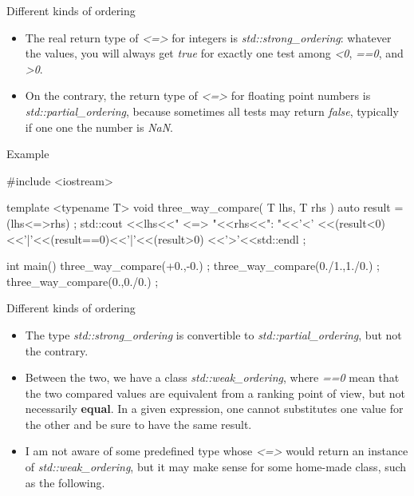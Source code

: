 \begin{frame}[fragile]
  \begin{block}{Different kinds of ordering}
    \begin{itemize}
    \item The real return type of {\it <=>} for integers is {\it std::strong_ordering}: whatever the values, you will always get {\it true} for exactly one test among {\it <0}, {\it ==0}, and {\it >0}.
    \item On the contrary, the return type of {\it <=>} for floating point numbers is {\it std::partial_ordering}, because sometimes all tests may return {\it false}, typically if one one the number is {\it NaN}.
    \end{itemize}
  \end{block}
  \begin{exampleblock}{Example}
    \begin{cppcode*}{}
#include <iostream>

template <typename T>
void three_way_compare( T lhs, T rhs )
 {
  auto result = (lhs<=>rhs) ;
  std::cout
    <<lhs<<" <=> "<<rhs<<": "<<'<'
    <<(result<0)<<'|'<<(result==0)<<'|'<<(result>0)
    <<'>'<<std::endl ;
 }

int main()
 {
  three_way_compare(+0.,-0.) ;
  three_way_compare(0./1.,1./0.) ;
  three_way_compare(0.,0./0.) ;
 }
    \end{cppcode*}
  \end{exampleblock}
\end{frame}

\begin{frame}[fragile]
  \begin{block}{Different kinds of ordering}
    \begin{itemize}
      \item The type {\it std::strong_ordering} is convertible to {\it std::partial_ordering}, but not the contrary.
      \item Between the two, we have a class {\it std::weak_ordering}, where {\it ==0} mean that the two compared values are equivalent from a ranking point of view, but not necessarily \textbf{equal}. In a given expression, one cannot substitutes one value for the other and be sure to have the same result.
      \item I am not aware of some predefined type whose {\it <=>} would return an instance of {\it std::weak_ordering}, but it may make sense for some home-made class, such as the following.
    \end{itemize}
  \end{block}
\end{frame}

